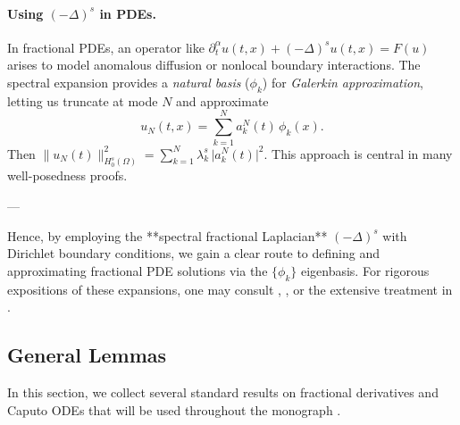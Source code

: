 \documentclass[12pt]{article}
\begin{document}
\paragraph{Using \((- \Delta)^s\) in PDEs.}
In fractional PDEs, an operator like 
\(\partial_t^\alpha u(t,x) + (-\Delta)^s u(t,x) = F(u)\) arises to model anomalous
diffusion or nonlocal boundary interactions.  The spectral expansion provides a 
\emph{natural basis} (\(\phi_k\)) for \emph{Galerkin approximation}, letting us 
truncate at mode \(N\) and approximate
\[
u_N(t,x)
= \sum_{k=1}^N a_k^N(t)\,\phi_k(x).
\]
Then \(\|u_N(t)\|_{H_0^s(\Omega)}^2 = \sum_{k=1}^N \lambda_k^s\,\lvert a_k^N(t)\rvert^2\).  
This approach is central in many well-posedness proofs.

---

Hence, by employing the **spectral fractional Laplacian** \((-\Delta)^s\) with Dirichlet 
boundary conditions, we gain a clear route to defining and approximating fractional PDE 
solutions via the \(\{\phi_k\}\) eigenbasis. For rigorous expositions of these expansions, 
one may consult \cite[Ch.~1]{Kilbas2006}, \cite[Sec.~3.1]{Diethelm2010}, or the extensive 
treatment in \cite{DiNezzaPalatucciValdinoci}.


\subsection{General Lemmas}
\label{sec:general_lemmas}

In this section, we collect several standard results on fractional derivatives 
and Caputo ODEs that will be used throughout the monograph \cite{Diethelm2010, 
Kilbas2006, Ye2007, Sun2019}.
\end{document}
